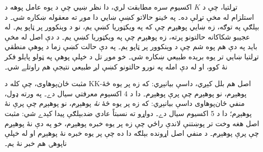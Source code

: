 \documentclass[../../../include/open-logic-section]{subfiles}
\begin{document}
تړلتيا، چې د $K$ اکسيوم سره مطابقت لري، دا نظر ښيي چې د يوه
عامل پوهه د استلزام له مخې تړلې ده۔ په ځينو حالاتو کښې ښايي دا
موږ ته معقوله ښکاره شي۔ د بېلګې په توګه، زه ښايي پوهېږم چې که
په ويکټوريا کښې يم، نو د وېنکوور پر ټاپو يم۔ له عجيبو شکاکانه
حالتونو پرته، زه پوهېږم چې په ويکټوريا کښې يم۔ د دې اصل له مخې
بايد په دې هم پوه شم چې د وېنکوور پر ټاپو يم۔ په دې حالت کښې زما د پوهې
منطقي تړلتيا ښايي تر يوه بريده طبيعي ښکاره شي۔ خو موږ تل د
خپلې پوهې په ټولو پايلو فکر نۀ کوو، او له دې امله په نورو
حالتونو کښې لږ طبيعي نتيجې هم راوتلے شي۔

مثبت ځان‌پوهاوی، چې کله د KK-اصل هم بلل کېږي، داسې بيانېږي: که
زه پر يوه څۀ پوهېږم، نو پوهېږم چې پرې پوهېږم۔ دا د 4 اکسيوم
معرفتي سيال دے۔ په ورته ډول، منفي ځان‌پوهاوی داسې بيانېږي: که
زه پر يوه څۀ \emph{نۀ} پوهېږم، نو پوهېږم چې پرې نۀ پوهېږم؛ دا د
5 اکسيوم سيال دے۔ دواړو ته نسبتاً عادي ضدبېلګې پيدا کېدے شي:
مثبت اصل هغه وخت تر پوښتنې لاندې راځي چې زه پر يوه خبره
پوهېږم، خو په دې نۀ پوهېږم چې پرې پوهېږم۔ د منفي اصل اړونده
بېلګه دا ده چې پر يوه خبره نۀ پوهېږم او له خپلې ناپوهۍ هم خبر
نۀ يم۔
\end{document}
